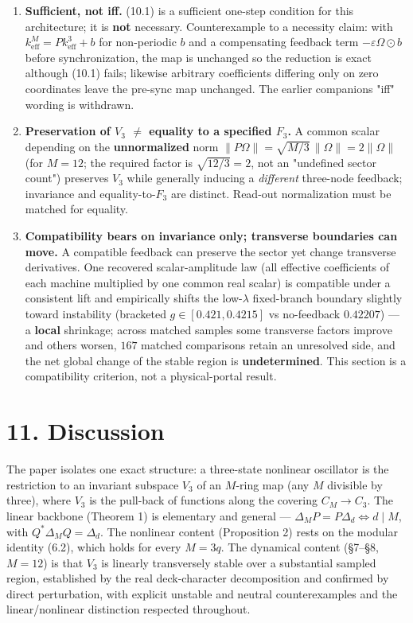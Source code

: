 \documentclass[
  11pt,
  a4paper,
]{article}
\providecommand{\tightlist}{%
  \setlength{\itemsep}{0pt}\setlength{\parskip}{0pt}}
\begin{document}
\begin{enumerate}
\def\labelenumi{\arabic{enumi}.}
\tightlist
\item
  \textbf{Sufficient, not iff.} (10.1) is a sufficient one-step condition for this architecture; it is \textbf{not} necessary. Counterexample to a necessity claim: with \(k_{\mathrm{eff}}^{M}=Pk_{\mathrm{eff}}^3+b\) for non-periodic \(b\) and a compensating feedback term \(-\varepsilon\Omega\odot b\) before synchronization, the map is unchanged so the reduction is exact although (10.1) fails; likewise arbitrary coefficients differing only on zero coordinates leave the pre-sync map unchanged. The earlier companion\textquotesingle s "iff" wording is withdrawn.
\item
  \textbf{Preservation of \(V_3\) \(\neq\) equality to a specified \(F_3\).} A common scalar depending on the \textbf{unnormalized} norm \(\|P\Omega\|=\sqrt{M/3}\,\|\Omega\|=2\|\Omega\|\) (for \(M=12\); the required factor is \(\sqrt{12/3}=2\), not an "undefined sector count") preserves \(V_3\) while generally inducing a \emph{different} three-node feedback; invariance and equality-to-\(F_3\) are distinct. Read-out normalization must be matched for equality.
\item
  \textbf{Compatibility bears on invariance only; transverse boundaries can move.} A compatible feedback can preserve the sector yet change transverse derivatives. One recovered scalar-amplitude law (all effective coefficients of each machine multiplied by one common real scalar) is compatible under a consistent lift and empirically shifts the low-\(\lambda\) fixed-branch boundary slightly toward instability (bracketed \(g\in[0.421,0.4215]\) vs no-feedback \(0.42207\)) --- a \textbf{local} shrinkage; across matched samples some transverse factors improve and others worsen, \(167\) matched comparisons retain an unresolved side, and the net global change of the stable region is \textbf{undetermined}. This section is a compatibility criterion, not a physical-portal result.
\end{enumerate}

\section{11. Discussion}\label{discussion}

The paper isolates one exact structure: a three-state nonlinear oscillator is the restriction to an invariant subspace \(V_3\) of an \(M\)-ring map (any \(M\) divisible by three), where \(V_3\) is the pull-back of functions along the covering \(C_M\to C_3\). The linear backbone (Theorem 1) is elementary and general --- \(\Delta_M P=P\Delta_d\iff d\mid M\), with \(Q^\ast\Delta_M Q=\Delta_d\). The nonlinear content (Proposition 2) rests on the modular identity (6.2), which holds for every \(M=3q\). The dynamical content (§7--§8, \(M=12\)) is that \(V_3\) is linearly transversely stable over a substantial sampled region, established by the real deck-character decomposition and confirmed by direct perturbation, with explicit unstable and neutral counterexamples and the linear/nonlinear distinction respected throughout.
\end{document}
